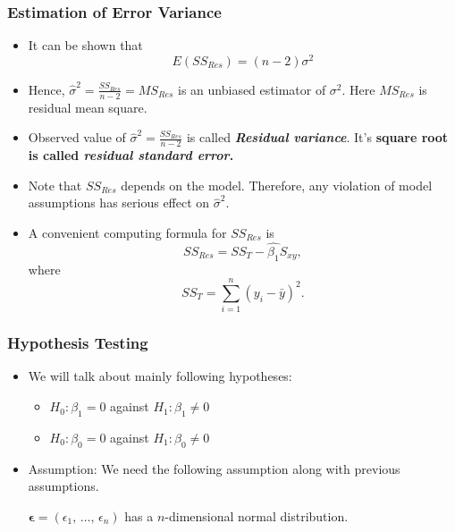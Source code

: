 \documentclass[10pt]{beamer} %
\begin{document}
\begin{frame}
\frametitle{Estimation of Error Variance}
\begin{itemize}
   \item It can be shown that 
      $$E(SS_{Res}) = (n-2) \sigma^2$$
      \vspace{0.01cm}

   \item Hence, $\hat\sigma^2 = \frac{SS_{Res}}{n-2} = MS_{Res}$ is an unbiased
      estimator of $\sigma^2$. Here $MS_{Res}$ is residual mean square. 
      \vspace{0.25cm}

   \item Observed value of $\hat\sigma^2 = \frac{SS_{Res}}{n-2}$ is called
      \emph{\textbf{Residual variance}}. It's \textbf{square root is called
      \emph{residual standard error}.}
      \bigskip
   \item Note that $SS_{Res}$ depends on the model. Therefore, any violation of
      model assumptions has serious effect on $\hat\sigma^2$. 
      \vspace{0.25cm}

   \item A convenient computing formula for $SS_{Res}$ is
      $$SS_{Res} = SS_{T} - \hat{\beta_1} S_{xy}, $$ where $$SS_{T} = \sum_{i=1}^{n}(y_i - \bar{y})^2.$$
\end{itemize}	

\end{frame}



\begin{frame}
   \frametitle{Hypothesis Testing}
   \begin{itemize}
      \item We will talk about mainly following hypotheses:
         \begin{itemize}
            \item $H_0: \beta_1=0$ against $H_1:\beta_1\neq 0$
            \item $H_0: \beta_0=0$ against $H_1:\beta_0\neq 0$
         \end{itemize}
         \bigskip
      \item Assumption: We need the following assumption along with previous
         assumptions.
         \begin{center}
            $\boldsymbol{\epsilon} = \left( \epsilon_1,\,\ldots,\,\epsilon_n
            \right)$ has a $n$-dimensional normal distribution.
         \end{center}
   \end{itemize}
\end{frame}
\end{document}
